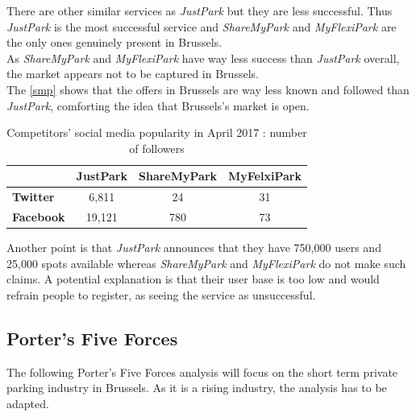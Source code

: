 \documentclass[12pt,a4paper,oneside]{book}
\begin{document}
There are other similar services as \textit{JustPark} but they are less successful. Thus \textit{JustPark} is the most successful service and \textit{ShareMyPark} and \textit{MyFlexiPark} are the only ones genuinely present in Brussels.\\

As \textit{ShareMyPark} and \textit{MyFlexiPark} have way less success than \textit{JustPark} overall, the market appears not to be captured in Brussels.\\

The \autoref{smp} shows that the offers in Brussels are way less known and followed than \textit{JustPark}, comforting the idea that Brussels's market is open.

\begin{table}[h]
\centering
\caption{Competitors' social media popularity in April 2017 : number of followers}
\label{smp}
\begin{tabular}{@{}lccc@{}}
\toprule
\textbf{}         & JustPark & ShareMyPark & MyFelxiPark \\ \midrule
\textbf{Twitter}  & 6,811    & 24          & 31          \\ \midrule
\textbf{Facebook} & 19,121   & 780         & 73          \\ \bottomrule
\end{tabular}
\end{table}

Another point is that \textit{JustPark} announces that they have 750,000 users and 25,000 spots available whereas \textit{ShareMyPark} and \textit{MyFlexiPark} do not make such claims.\cite{jpu,jpd} A potential explanation is that their user base is too low and would refrain people to register, as seeing the service as unsuccessful.



\subsection{Porter's Five Forces}
The following Porter's Five Forces analysis will focus on the short term private parking industry in Brussels. As it is a rising industry, the analysis has to be adapted.\\
\end{document}
